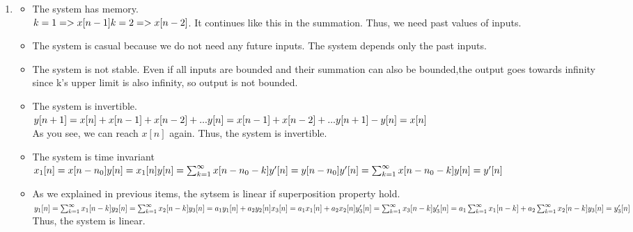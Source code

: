 \documentclass[10pt,a4paper, margin=1in]{article}
\begin{document}
\begin{enumerate}
\begin{enumerate}
    \item %
    \begin{itemize}
    \item The system has memory.\\
    $k=1 => x[n-1]\\
    k=2 => x[n-2]$. It continues like this in the summation. Thus, we need past values of inputs.
    \item The system is casual because we do not need any future inputs. The system depends only the past inputs.
    \item The system is not stable. Even if all inputs are bounded and their summation can also be bounded,the output goes towards infinity since k's upper limit is also infinity, so output is not bounded.
    \item The system is invertible.\\$y[n+1]=x[n]+x[n-1]+x[n-2]+...\\
    y[n]=x[n-1]+x[n-2]+...\\
    y[n+1]-y[n]=x[n]$ \\
    As you see, we can reach $x[n]$ again. Thus, the system is invertible.
    \item The system is time invariant\\
    $x_1[n]= x[n-n_0]\\
    y[n]=x_1[n]\\
    y[n]= \sum_{k=1}^{\infty} x[n-n_0-k] \\
    y'[n]=y[n-n_0]\\
    y'[n]=\sum_{k=1}^{\infty} x[n-n_0-k]\\
    y[n]=y'[n]$
    \item As we explained in previous items, the sytsem is linear if superposition property hold.\\
    $y_1[n]=\sum_{k=1}^{\infty} x_1[n-k]\\
    y_2[n]=\sum_{k=1}^{\infty} x_2[n-k]\\
    y_3[n]=a_1y_1[n] + a_2y_2[n]\\
    x_3[n]=a_1x_1[n]+a_2x_2[n]\\
    y_3'[n]= \sum_{k=1}^{\infty} x_3[n-k]\\
    y_3'[n]=a_1 \sum_{k=1}^{\infty} x_1[n-k] + a_2 \sum_{k=1}^{\infty} x_2[n-k]\\
    y_3[n]=y_3'[n]$ \\
    Thus, the system is linear.
    
    
    \end{itemize}
    \end{enumerate}
    
\end{enumerate}
\end{document}
